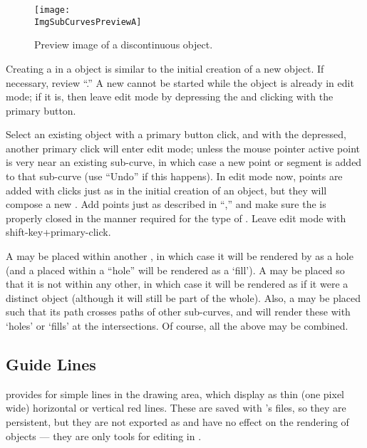 		\begin{figure}[htb!]
		\centering
		\texttt{[image: \\ImgSubCurvesPreviewA]}
		\caption{Preview image of a discontinuous object.}
		\label{fig:subcurves_1}
		\end{figure}
		
		Creating a  in a
		\IXspline{} object is similar
		to the initial creation of a new \IXspline{} object.
		If necessary, review
		``.''
		A new  cannot be started while
		the object is already in edit mode; if it is,
		then leave edit mode by depressing the 
		 and clicking with the primary button.
		
		Select an existing object with a primary button
		click, and with the  
		depressed, another primary click will enter
		edit mode; unless the mouse pointer active point
		is very near an existing sub-curve, in which
		case a new point or segment is added to that
		sub-curve (use ``Undo'' if this happens).
		In edit mode now, points are added with clicks
		just as in the initial creation of an object,
		but they will compose a new .
		Add points just as described in
		``,'' and make
		sure the  is properly closed
		in the manner required for the type of \IXspline{}.
		Leave edit mode with shift-key+primary-click.
		
		A  may be placed within another
		, in which case it will be
		rendered by \IXpov{} as a hole (and a
		 placed within a ``hole''
		will be rendered as a `fill').
		A  may be placed so that it
		is not within any other, in which case it will be
		rendered as if it were a distinct object
		(although it will still be part of the whole).
		Also, a  may be placed such
		that its path crosses paths of other sub-curves,
		and \IXpov{} will render these with `holes'
		or `fills' at the intersections. Of course,
		all the above may be combined.

		\subsection{Guide Lines}%
		\label{ssec:guide_lines}
		\IXpkgu{} provides for simple  lines
		in the drawing area, which display as thin
		(one pixel wide) horizontal or vertical
		red lines. These are saved with \IXpkg{}'s
		files, so they are persistent, but they are
		not exported as  and have no effect
		on the rendering of objects --- they are only
		tools for editing in \IXpkg{}.
		
